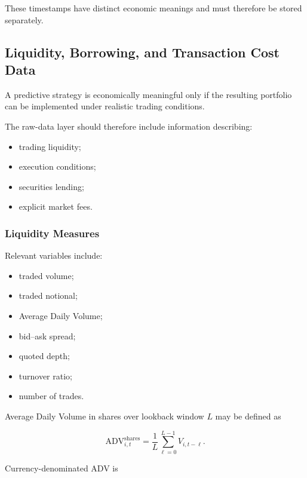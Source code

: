 \documentclass[11pt,a4paper]{article}
\begin{document}
These timestamps have distinct economic meanings and must therefore be stored
separately.


\subsection{Liquidity, Borrowing, and Transaction Cost Data}
\label{subsec:liquidity_borrowing_transaction_cost_data}

A predictive strategy is economically meaningful only if the resulting
portfolio can be implemented under realistic trading conditions.

The raw-data layer should therefore include information describing:

\begin{itemize}
    \item trading liquidity;
    \item execution conditions;
    \item securities lending;
    \item explicit market fees.
\end{itemize}


\subsubsection{Liquidity Measures}

Relevant variables include:

\begin{itemize}
    \item traded volume;
    \item traded notional;
    \item Average Daily Volume;
    \item bid--ask spread;
    \item quoted depth;
    \item turnover ratio;
    \item number of trades.
\end{itemize}

Average Daily Volume in shares over lookback window $L$ may be defined as

\begin{equation}
\mathrm{ADV}_{i,t}^{\mathrm{shares}}
=
\frac{1}{L}
\sum_{\ell=0}^{L-1}
V_{i,t-\ell}.
\end{equation}

Currency-denominated ADV is
\end{document}
